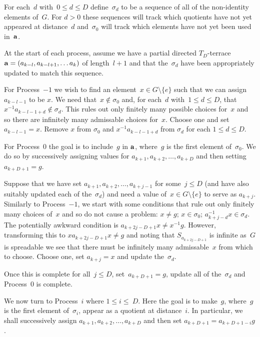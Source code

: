\documentclass[12pt,a4paper]{article}
\begin{document}
For each~$d$ with~$0 \leq d \leq D$ define~$\sigma_d$ to be a sequence of all of the non-identity elements of~$G$.  For $d>0$ these sequences will track which quotients have not yet appeared at distance~$d$ and~$\sigma_0$ will track which elements have not yet been used in~${\bf a}$.  

At the start of each process, assume we have a partial directed  $T_{D}$-terrace~${\bf a} = (a_{k-l}, a_{k-l+1}, \ldots a_k)$ of length~$l+1$ and that the~$\sigma_d$ have been appropriately updated to match this sequence.

For Process~$-1$ we wish to find an element~$x \in G \setminus \{e\}$ such that we can assign $a_{k-l-1}$ to be $x$.  We need that~$x \not\in \sigma_0$ and, for each~$d$ with~$1 \leq d \leq D$, that $x^{-1}a_{k-l-1+d} \not\in \sigma_d$.  This rules out only finitely many possible choices for~$x$ and so there are infinitely many admissable choices for~$x$.  Choose one and set  $a_{k-l-1} = x$.  Remove $x$ from $\sigma_0$ and $x^{-1}a_{k-l-1+d}$ from $\sigma_d$ for each $1 \leq d \leq D$.

For Process~0 the goal is to include~$g$ in ${\bf a}$, where~$g$ is the first element of~$\sigma_0$.  We do so by successively assigning values for $a_{k+1}, a_{k+2}, \ldots, a_{k+D}$ and then setting~$a_{k+D+1} = g$.

Suppose that we have set $a_{k+1}, a_{k+2}, \ldots, a_{k+j-1}$ for some~$j \leq D$ (and have also suitably updated each of the~$\sigma_d$) and need a value of~$x \in G \setminus \{e\}$ to serve as $a_{k+j}$.  Similarly to Process~$-1$, we start with some conditions that rule out only finitely many choices of~$x$ and so do not cause a problem: $ x \neq g$; $x \in \sigma_0$; $a_{k+j-d}^{-1}x \in \sigma_d$.  The potentially awkward condition is  $a_{k+2j-D+1}x \neq   x^{-1}g$.  However, transforming this to $xa_{k+2j-D+1}x \neq g$ and noting that $S_{a_{k+2j-D+1}}$ is infinite as~$G$ is spreadable we see that there must be infinitely many admissable~$x$ from which to choose.  Choose one, set $a_{k+j} = x$ and update the~$\sigma_d$.

Once this is complete for all~$j \leq D$, set~$a_{k+D+1} = g$, update all of the~$\sigma_d$ and Process~0 is complete.

We now turn to Process~$i$ where $1 \leq i \leq~D$.  Here the goal is to make~$g$, where~$g$ is the first element of~$\sigma_i$, appear as a quotient at distance~$i$.  In particular, we shall successively assign $a_{k+1}, a_{k+2}, \ldots, a_{k+D}$ and then set $a_{k+D+1} = a_{k+D+1-i}g$.
\end{document}
